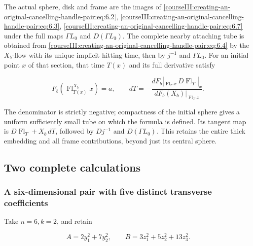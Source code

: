 The actual sphere, disk and frame are the images of \eqref{courseIII:creating-an-original-cancelling-handle-pair:eq:6.2}, \eqref{courseIII:creating-an-original-cancelling-handle-pair:eq:6.3}, \eqref{courseIII:creating-an-original-cancelling-handle-pair:eq:6.7} under the full maps \(\Gamma L_0\) and \(D(\Gamma L_0)\). The complete nearby attaching tube is obtained from \eqref{courseIII:creating-an-original-cancelling-handle-pair:eq:6.4} by the \(X_b\)-flow with its unique implicit hitting time, then by \(j^{-1}\) and \(\Gamma L_0\). For an initial point \(x\) of that section, that time \(T(x)\) and its full derivative satisfy

\begin{equation}
F_b(\operatorname{Fl}^{X_b}_{T(x)}x)=a,\qquad
 dT=-\frac{dF_b|_{\operatorname{Fl}_{T}x}\,
                  D\operatorname{Fl}_{T}|_x}
                 {dF_b(X_b)|_{\operatorname{Fl}_{T}x}}.
 \label{courseIII:creating-an-original-cancelling-handle-pair:eq:6.8}
\end{equation}

The denominator is strictly negative; compactness of the initial sphere gives a uniform sufficiently small tube on which the formula is defined. Its tangent map is \(D\operatorname{Fl}_T+X_b\,dT\), followed by \(Dj^{-1}\) and \(D(\Gamma L_0)\). This retains the entire thick embedding and all frame contributions, beyond just its central sphere.

\subsection{Two complete calculations}
\label{courseIII:creating-an-original-cancelling-handle-pair:pair-exercises}

\label{courseIII:creating-an-original-cancelling-handle-pair:section-7}

\subsubsection{A six-dimensional pair with five distinct transverse coefficients}
\label{courseIII:creating-an-original-cancelling-handle-pair:section-7.1}

\label{courseIII:pair-creation:7.1}

Take \(n=6,k=2\), and retain

\begin{equation}
A=2y_1^2+7y_2^2,\qquad B=3z_1^2+5z_2^2+13z_3^2.
 \label{courseIII:creating-an-original-cancelling-handle-pair:eq:7.1}
\end{equation}

